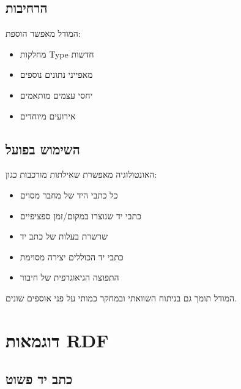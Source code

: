 \subsection{הרחיבות}

המודל מאפשר הוספת:
\begin{itemize}
\item מחלקות Type חדשות
\item מאפייני נתונים נוספים
\item יחסי עצמים מותאמים
\item אירועים מיוחדים
\end{itemize}

\subsection{השימוש בפועל}

האונטולוגיה מאפשרת שאילתות מורכבות כגון:
\begin{itemize}
\item כל כתבי היד של מחבר מסוים
\item כתבי יד שנוצרו במקום/זמן ספציפיים
\item שרשרת בעלות של כתב יד
\item כתבי יד הכוללים יצירה מסוימת
\item התפוצה הגיאוגרפית של חיבור
\end{itemize}

המודל תומך גם בניתוח השוואתי ובמחקר כמותי על פני אוספים שונים.

\newpage

\section{דוגמאות RDF}

\subsection{כתב יד פשוט}

